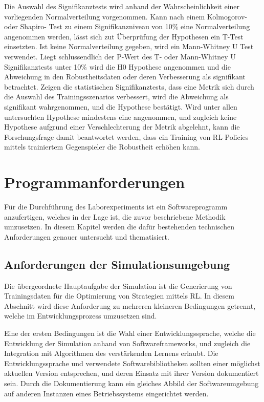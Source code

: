 Die Auswahl des Signifikanztests wird anhand der Wahrscheinlichkeit einer vorliegenden Normalverteilung vorgenommen.
Kann nach einem Kolmogorov- oder Shapiro- Test zu einem Signifikanzniveau von 10\% eine Normalverteilung angenommen werden, lässt sich zut Überprüfung der Hypothesen ein T-Test einsetzten.
Ist keine Normalverteilung gegeben, wird ein Mann-Whitney U Test verwendet.
Liegt schlussendlich der P-Wert des T- oder Mann-Whitney U Signifikanztests unter 10\% wird die H0 Hypothese angenommen und die Abweichung in den Robustheitsdaten oder deren Verbesserung als signifikant betrachtet.
Zeigen die statistischen Signifikanztests, dass eine Metrik sich durch die Auswahl des Trainingsszenarios verbessert, wird die Abweichung als signifikant wahrgenommen, und die Hypothese bestätigt.
Wird unter allen untersuchten Hypothese mindestens eine angenommen, und zugleich keine Hypothese aufgrund einer Verschlechterung der Metrik abgelehnt, kann die Forschungsfrage damit beantwortet werden, dass ein Training von RL Policies mittels trainiertem Gegenspieler die Robustheit erhöhen kann.

\section{Programmanforderungen}

Für die Durchführung des Laborexperiments ist ein Softwareprogramm anzufertigen, welches in der Lage ist, die zuvor beschriebene Methodik umzusetzen.
In diesem Kapitel werden die dafür bestehenden technischen Anforderungen genauer untersucht und thematisiert. 

\subsection{Anforderungen der Simulationsumgebung}

Die übergeordnete Hauptaufgabe der Simulation ist die Generierung von Trainingsdaten für die Optimierung von Strategien mittels RL.
In diesem Abschnitt wird diese Anforderung zu mehreren kleineren Bedingungen getrennt, welche im Entwicklungsprozess umzusetzen sind.

Eine der ersten Bedingungen ist die Wahl einer Entwicklungssprache, welche die Entwicklung der Simulation anhand von Softwareframeworks, und zugleich die Integration mit Algorithmen des verstärkenden Lernens erlaubt.
Die Entwicklungssprache und verwendete Softwarebibliotheken sollten einer möglichst aktuellen Version entsprechen, und deren Einsatz mit ihrer Version dokumentiert sein.
Durch die Dokumentierung kann ein gleiches Abbild der Softwareumgebung auf anderen Instanzen eines Betriebssystems eingerichtet werden. 

